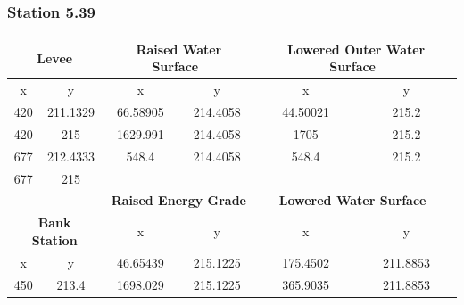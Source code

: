     \subsubsection{Station 5.39}
\begin{center}
    \begin{tabular}{|cc|cc|cc|} 
        \hline
        \multicolumn{2}{|c|}{\textbf{Levee }}                    & \multicolumn{2}{c|}{\textbf{Raised Water Surface~ }} & \multicolumn{2}{c|}{\textbf{Lowered Outer Water Surface~ }}  \\ 
        \hline
        x        & y                                             & x        & y                                         & x        & y                                                 \\
        420      & 211.1329                                      & 66.58905 & 214.4058                                  & 44.50021 & 215.2                                             \\
        420      & 215                                           & 1629.991 & 214.4058                                  & 1705     & 215.2                                             \\
        677      & 212.4333                                      & 548.4    & 214.4058                                  & 548.4    & 215.2                                             \\
        677      & 215                                           &          &                                           &          &                                                   \\
                 &                                               & \multicolumn{2}{c|}{\textbf{Raised Energy Grade }}   & \multicolumn{2}{c|}{\textbf{Lowered Water Surface~ }}        \\ 
        \cline{3-6}
        \multicolumn{2}{|c|}{\textbf{Bank Station }}             & x        & y                                         & x        & y                                                 \\ 
        \cline{1-2}
        x        & y                                             & 46.65439 & 215.1225                                  & 175.4502 & 211.8853                                          \\
        450      & 213.4                                         & 1698.029 & 215.1225                                  & 365.9035 & 211.8853                                          \\

\end{tabular}
\end{center}
